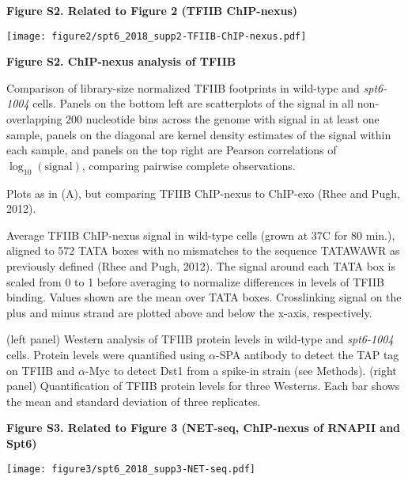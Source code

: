 \documentclass[9pt, letterpaper]{extarticle}
\begin{document}
\newpage

\textbf{\large Figure S2. Related to Figure 2 (TFIIB ChIP-nexus)}

{\centering \texttt{[image: figure2/spt6\_2018\_supp2-TFIIB-ChIP-nexus.pdf]}\par}

\textbf{Figure S2. ChIP-nexus analysis of TFIIB}

\begin{description}[noitemsep, topsep=0pt, align=right, labelwidth=12pt, itemindent=0pt, leftmargin=0pt]
	\item [\textbf{(A)}] Comparison of library-size normalized TFIIB footprints in wild-type and \textit{spt6-1004} cells. Panels on the bottom left are scatterplots of the signal in all non-overlapping 200 nucleotide bins across the genome with signal in at least one sample, panels on the diagonal are kernel density estimates of the signal within each sample, and panels on the top right are Pearson correlations of $\log_{10}\left(\text{signal} \right)$, comparing pairwise complete observations.
	\item [\textbf{(B)}] Plots as in (A), but comparing TFIIB ChIP-nexus to ChIP-exo (Rhee and Pugh, 2012).
	\item [\textbf{(C)}] Average TFIIB ChIP-nexus signal in wild-type cells (grown at 37{\textdegree}C for 80 min.), aligned to 572 TATA boxes with no mismatches to the sequence TATAWAWR as previously defined (Rhee and Pugh, 2012). The signal around each TATA box is scaled from 0 to 1 before averaging to normalize differences in levels of TFIIB binding. Values shown are the mean over TATA boxes. Crosslinking signal on the plus and minus strand are plotted above and below the x-axis, respectively.
	\item [\textbf{(D)}] (left panel) Western analysis of TFIIB protein levels in wild-type and \textit{spt6-1004} cells. Protein levels were quantified using $\alpha$-SPA antibody to detect the TAP tag on TFIIB and $\alpha$-Myc to detect Dst1 from a spike-in strain (see Methods). (right panel) Quantification of TFIIB protein levels for three Westerns. Each bar shows the mean and standard deviation of three replicates.
\end{description}

\newpage

\textbf{\large Figure S3. Related to Figure 3 (NET-seq, ChIP-nexus of RNAPII and Spt6)}

{\centering \texttt{[image: figure3/spt6\_2018\_supp3-NET-seq.pdf]}\par}
\end{document}
